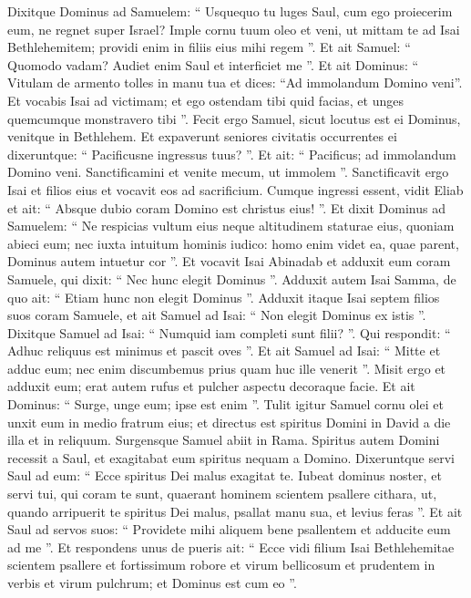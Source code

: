 \begin{biblechapter}
\begin{biblechapter}
\begin{biblechapter}
\begin{biblechapter}
\begin{biblechapter}
\begin{biblechapter}
\begin{biblechapter}
\begin{biblechapter}
\begin{biblechapter}
\begin{biblechapter}
\begin{biblechapter}
\begin{biblechapter}
\begin{biblechapter}
\begin{biblechapter}
\begin{biblechapter}
\begin{biblechapter}
\verse Dixitque Dominus ad Samuelem: “ Usquequo tu luges Saul, cum ego proiecerim eum, ne regnet super Israel? Imple cornu tuum oleo et veni, ut mittam te ad Isai Bethlehemitem; providi enim in filiis eius mihi regem ”. 
\verse Et ait Samuel: “ Quomodo vadam? Audiet enim Saul et interficiet me ”. Et ait Dominus: “ Vitulam de armento tolles in manu tua et dices: “Ad immolandum Domino veni”. 
 \verse Et vocabis Isai ad victimam; et ego ostendam tibi quid facias, et unges quemcumque monstravero tibi ”.
 \verse Fecit ergo Samuel, sicut locutus est ei Dominus, venitque in Bethlehem. Et expaverunt seniores civitatis occurrentes ei dixeruntque: “ Pacificusne ingressus tuus? ”. 
\verse Et ait: “ Pacificus; ad immolandum Domino veni. Sanctificamini et venite mecum, ut immolem ”. Sanctificavit ergo Isai et filios eius et vocavit eos ad sacrificium.
 \verse Cumque ingressi essent, vidit Eliab et ait: “ Absque dubio coram Domino est christus eius! ”. 
\verse Et dixit Dominus ad Samuelem: “ Ne respicias vultum eius neque altitudinem staturae eius, quoniam abieci eum; nec iuxta intuitum hominis iudico: homo enim videt ea, quae parent, Dominus autem intuetur cor ”. 
\verse Et vocavit Isai Abinadab et adduxit eum coram Samuele, qui dixit: “ Nec hunc elegit Dominus ”. 
\verse Adduxit autem Isai Samma, de quo ait: “ Etiam hunc non elegit Dominus ”. 
\verse Adduxit itaque Isai septem filios suos coram Samuele, et ait Samuel ad Isai: “ Non elegit Dominus ex istis ”.
 \verse Dixitque Samuel ad Isai: “ Numquid iam completi sunt filii? ”. Qui respondit: “ Adhuc reliquus est minimus et pascit oves ”. Et ait Samuel ad Isai: “ Mitte et adduc eum; nec enim discumbemus prius quam huc ille venerit ”. 
\verse Misit ergo et adduxit eum; erat autem rufus et pulcher aspectu decoraque facie. Et ait Dominus: “ Surge, unge eum; ipse est enim ”. 
\verse Tulit igitur Samuel cornu olei et unxit eum in medio fratrum eius; et directus est spiritus Domini in David a die illa et in reliquum. Surgensque Samuel abiit in Rama.
 \verse Spiritus autem Domini recessit a Saul, et exagitabat eum spiritus nequam a Domino. 
\verse Dixeruntque servi Saul ad eum: “ Ecce spiritus Dei malus exagitat te. 
\verse Iubeat dominus noster, et servi tui, qui coram te sunt, quaerant hominem scientem psallere cithara, ut, quando arripuerit te spiritus Dei malus, psallat manu sua, et levius feras ”. 
\verse Et ait Saul ad servos suos: “ Providete mihi aliquem bene psallentem et adducite eum ad me ”. 
\verse Et respondens unus de pueris ait: “ Ecce vidi filium Isai Bethlehemitae scientem psallere et fortissimum robore et virum bellicosum et prudentem in verbis et virum pulchrum; et Dominus est cum eo ”. 

\end{biblechapter}
\end{biblechapter}
\end{biblechapter}
\end{biblechapter}
\end{biblechapter}
\end{biblechapter}
\end{biblechapter}
\end{biblechapter}
\end{biblechapter}
\end{biblechapter}
\end{biblechapter}
\end{biblechapter}
\end{biblechapter}
\end{biblechapter}
\end{biblechapter}
\end{biblechapter}
